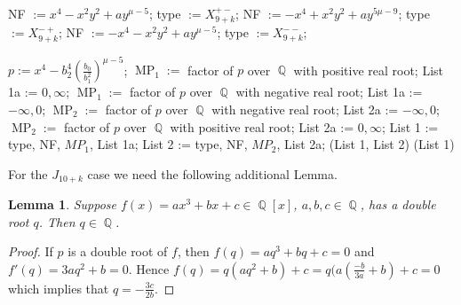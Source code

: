\documentclass[noend]{amsproc}
\newtheorem{lemma}[theorem]{Lemma}
\theoremstyle{definition}
\DeclareMathOperator{\MP}{MP}
\DeclareMathOperator{\Q}{\mathbb{Q}}
\begin{document}
\begin{algorithm}[ht]
\begin{algorithmic}[1]
\Else
\State NF $:= x^4-x^2y^2+ay^{\mu-5}$;
\State type $:= X_{9+k}^{+-}$;
\EndIf
\Else
{}
\State NF $:= -x^4+x^2y^2+ay^{5\mu-9}$;
\State type $:= X_{9+k}^{-+}$;
\Else
\State NF $:= -x^4-x^2y^2+ay^{\mu-5}$;
\State type $:= X_{9+k}^{--}$;
\EndIf
\EndIf

\State $p:= x^4-b_2^4\left(\frac{b_0}{b_1^{2}}\right)^{\mu-5}$;
{}
\State $\MP_1 := $ factor of $p$ over $\Q$ with positive real root;
\State List 1a := $0, \infty$;
\Else
\State $\MP_1 := $ factor of $p$ over $\Q$ with negative real root;
\State List 1a := $-\infty, 0$;
\EndIf
{}
\State $\MP_2 :=$ factor of $p$ over $\Q$ with negative real root;
\State List 2a := $-\infty, 0$;
\Else
{}
\State $\MP_2 := $ factor of $p$ over $\Q$ with positive real root;
\State List 2a := $0, \infty$;
\EndIf
\EndIf
\State List 1 := type, NF, $MP_1$, List 1a;
\State List 2 := type, NF, $MP_2$, List 2a;
\Return(List 1, List 2)
\Else
\Return (List 1)
\EndIf
\end{algorithmic}
\end{algorithm}
\clearpage

For the $J_{10+k}$ case we need the following additional Lemma.

\begin{lemma}
Suppose $f(x)=ax^3+bx+c\in\Q[x]$, $a,b,c\in\Q$, has a double root $q$. Then $q\in\Q$.
\end{lemma}
\begin{proof}
If $p$ is a double root of $f$, then $f(q)=aq^3+bq+c=0$ and $f'(q)=3aq^2+b=0$. Hence $f(q)=q(aq^2+b)+c=q(a(\frac{-b}{3a}+b)+c=0$ which implies that $q=-\frac{3c}{2b}$.
\end{proof}
\end{document}
